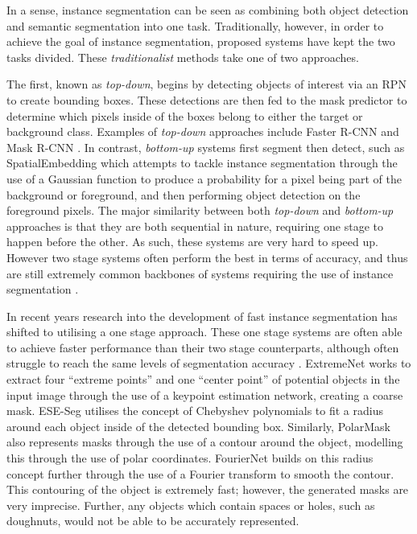 In a sense, instance segmentation can be seen as combining both object detection and semantic segmentation into one task. Traditionally, however, in order to achieve the goal of instance segmentation, proposed systems have kept the two tasks divided. These \textit{traditionalist} methods take one of two approaches. 

The first, known as \textit{top-down}, begins by detecting objects of interest via an RPN to create bounding boxes. These detections are then fed to the mask predictor to determine which pixels inside of the boxes belong to either the target or background class. Examples of \textit{top-down} approaches include Faster R-CNN \cite{ren_faster_2015} and Mask R-CNN \cite{he_mask_2017}. In contrast, \textit{bottom-up} systems first segment then detect, such as SpatialEmbedding \cite{neven_instance_2019} which attempts to tackle instance segmentation through the use of a Gaussian function to produce a probability for a pixel being part of the background or foreground, and then performing object detection on the foreground pixels. The major similarity between both \textit{top-down} and \textit{bottom-up} approaches is that they are both sequential in nature, requiring one stage to happen before the other. As such, these systems are very hard to speed up. However two stage systems often perform the best in terms of accuracy, and thus are still extremely common backbones of systems requiring the use of instance segmentation \cite{soviany_optimizing_2018}.

In recent years research into the development of fast instance segmentation has shifted to utilising a one stage approach. These one stage systems are often able to achieve faster performance than their two stage counterparts, although often struggle to reach the same levels of segmentation accuracy \cite{soviany_optimizing_2018}. ExtremeNet \cite{zhou_bottom-up_2019} works to extract four ``extreme points'' and one ``center point'' of potential objects in the input image through the use of a keypoint estimation network, creating a coarse mask. ESE-Seg \cite{xu_explicit_2019} utilises the concept of Chebyshev polynomials to fit a radius around each object inside of the detected bounding box. Similarly, PolarMask \cite{xie_polarmask_2020} also represents masks through the use of a contour around the object, modelling this through the use of polar coordinates. FourierNet \cite{riaz_fouriernet_2020} builds on this radius concept further through the use of a Fourier transform to smooth the contour. This contouring of the object is extremely fast; however, the generated masks are very imprecise. Further, any objects which contain spaces or holes, such as doughnuts, would not be able to be accurately represented. 

